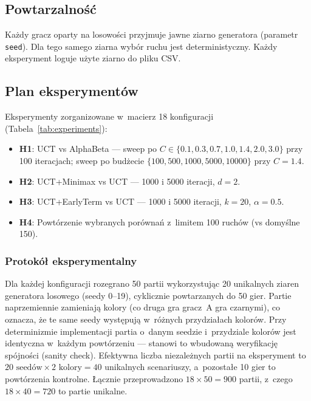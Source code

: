 \documentclass[12pt,a4paper]{article}
\begin{document}
\subsection{Powtarzalność}
Każdy gracz oparty na losowości przyjmuje jawne ziarno generatora (parametr \texttt{seed}). Dla tego samego ziarna wybór ruchu jest deterministyczny. Każdy eksperyment loguje użyte ziarno do pliku CSV.

\subsection{Plan eksperymentów}
Eksperymenty zorganizowane w~macierz 18 konfiguracji (Tabela~\ref{tab:experiments}):
\begin{itemize}[nosep]
  \item \textbf{H1}: UCT vs AlphaBeta — sweep po $C \in \{0.1, 0.3, 0.7, 1.0, 1.4, 2.0, 3.0\}$ przy 100 iteracjach; sweep po budżecie $\{100, 500, 1000, 5000, 10000\}$ przy $C=1.4$.
  \item \textbf{H2}: UCT+Minimax vs UCT — 1000 i 5000 iteracji, $d=2$.
  \item \textbf{H3}: UCT+EarlyTerm vs UCT — 1000 i 5000 iteracji, $k=20$, $\alpha=0.5$.
  \item \textbf{H4}: Powtórzenie wybranych porównań z~limitem 100 ruchów (vs domyślne 150).
\end{itemize}

\subsubsection{Protokół eksperymentalny}
Dla każdej konfiguracji rozegrano 50 partii wykorzystując 20 unikalnych ziaren generatora losowego (seedy 0--19), cyklicznie powtarzanych do 50 gier. Partie naprzemiennie zamieniają kolory (co druga gra gracz~A gra czarnymi), co oznacza, że te same seedy występują w~różnych przydziałach kolorów. Przy determinizmie implementacji partia o~danym seedzie i~przydziale kolorów jest identyczna w~każdym powtórzeniu — stanowi to wbudowaną weryfikację spójności (sanity check). Efektywna liczba niezależnych partii na eksperyment to $20 \text{ seedów} \times 2 \text{ kolory} = 40$ unikalnych scenariuszy, a~pozostałe 10 gier to powtórzenia kontrolne. Łącznie przeprowadzono $18 \times 50 = 900$ partii, z~czego $18 \times 40 = 720$ to partie unikalne.
\end{document}

